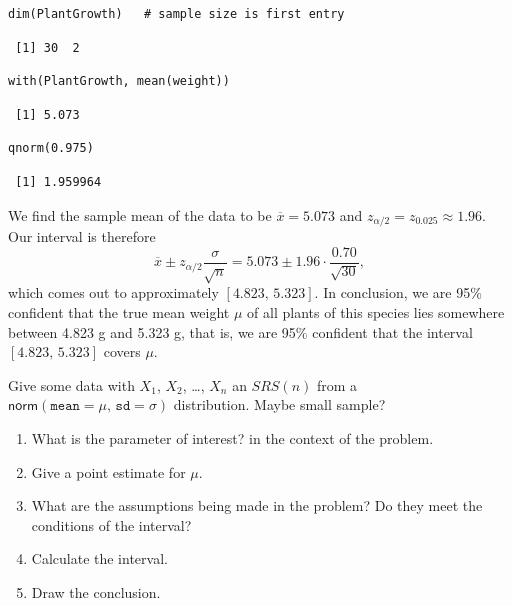 \documentclass[captions=tableheading]{scrbook}
\begin{document}
\lstset{language=R}
\begin{lstlisting}
dim(PlantGrowth)   # sample size is first entry
\end{lstlisting}

\begin{verbatim}
 [1] 30  2
\end{verbatim}


\lstset{language=R}
\begin{lstlisting}
with(PlantGrowth, mean(weight))
\end{lstlisting}

\begin{verbatim}
 [1] 5.073
\end{verbatim}


\lstset{language=R}
\begin{lstlisting}
qnorm(0.975)
\end{lstlisting}

\begin{verbatim}
 [1] 1.959964
\end{verbatim}

We find the sample mean of the data to be \(\overline{x}=5.073\) and \(z_{\alpha/2}=z_{0.025}\approx1.96\). Our interval is therefore
\[
\overline{x}\pm z_{\alpha/2}\frac{\sigma}{\sqrt{n}}=5.073\pm1.96\cdot\frac{0.70}{\sqrt{30}},
\]
which comes out to approximately \([4.823,\,5.323]\). In conclusion, we are 95\% confident that the true mean weight \(\mu\) of all plants of this species lies somewhere between 4.823 g and 5.323 g, that is, we are 95\% confident that the interval \([4.823,\,5.323]\) covers \(\mu\).

\begin{example}
Give some data with \(X_{1}\), \(X_{2}\), \ldots{}, \(X_{n}\) an \(SRS(n)\) from a \(\mathsf{norm}(\mathtt{mean}=\mu,\,\mathtt{sd}=\sigma)\) distribution. Maybe small sample?
\end{example}

\begin{enumerate}
\item What is the parameter of interest? in the context of the problem.
\item Give a point estimate for \(\mu\).
\item What are the assumptions being made in the problem? Do they meet the conditions of the interval?
\item Calculate the interval.
\item Draw the conclusion.
\end{enumerate}
\end{document}
